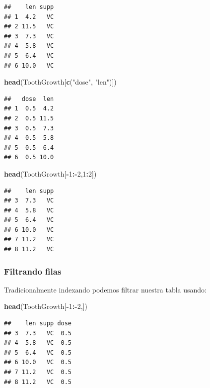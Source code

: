 \documentclass[
]{book}
\newenvironment{Shaded}{\begin{snugshade}}{\end{snugshade}}
\newcommand{\DecValTok}[1]{\textcolor[rgb]{0.00,0.00,0.81}{#1}}
\newcommand{\FunctionTok}[1]{\textcolor[rgb]{0.13,0.29,0.53}{\textbf{#1}}}
\newcommand{\NormalTok}[1]{#1}
\newcommand{\SpecialCharTok}[1]{\textcolor[rgb]{0.81,0.36,0.00}{\textbf{#1}}}
\newcommand{\StringTok}[1]{\textcolor[rgb]{0.31,0.60,0.02}{#1}}
\begin{document}
\begin{verbatim}
##    len supp
## 1  4.2   VC
## 2 11.5   VC
## 3  7.3   VC
## 4  5.8   VC
## 5  6.4   VC
## 6 10.0   VC
\end{verbatim}

\begin{Shaded}
\begin{Highlighting}[]
\FunctionTok{head}\NormalTok{(ToothGrowth[}\FunctionTok{c}\NormalTok{(}\StringTok{"dose"}\NormalTok{, }\StringTok{"len"}\NormalTok{)])}
\end{Highlighting}
\end{Shaded}

\begin{verbatim}
##   dose  len
## 1  0.5  4.2
## 2  0.5 11.5
## 3  0.5  7.3
## 4  0.5  5.8
## 5  0.5  6.4
## 6  0.5 10.0
\end{verbatim}

\begin{Shaded}
\begin{Highlighting}[]
\FunctionTok{head}\NormalTok{(ToothGrowth[}\SpecialCharTok{{-}}\DecValTok{1}\SpecialCharTok{:{-}}\DecValTok{2}\NormalTok{,}\DecValTok{1}\SpecialCharTok{:}\DecValTok{2}\NormalTok{])}
\end{Highlighting}
\end{Shaded}

\begin{verbatim}
##    len supp
## 3  7.3   VC
## 4  5.8   VC
## 5  6.4   VC
## 6 10.0   VC
## 7 11.2   VC
## 8 11.2   VC
\end{verbatim}

\hfill\break

\subsubsection{Filtrando filas}\label{filtrando-filas}

Tradicionalmente indexando podemos filtrar nuestra tabla usando:

\begin{Shaded}
\begin{Highlighting}[]
\FunctionTok{head}\NormalTok{(ToothGrowth[}\SpecialCharTok{{-}}\DecValTok{1}\SpecialCharTok{:{-}}\DecValTok{2}\NormalTok{,])}
\end{Highlighting}
\end{Shaded}

\begin{verbatim}
##    len supp dose
## 3  7.3   VC  0.5
## 4  5.8   VC  0.5
## 5  6.4   VC  0.5
## 6 10.0   VC  0.5
## 7 11.2   VC  0.5
## 8 11.2   VC  0.5
\end{verbatim}
\end{document}
